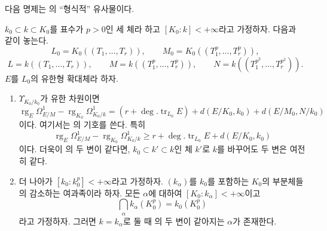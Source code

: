 다음 명제는 의 ``형식적'' 유사물이다.

\begin{proposition}[21.9.6]
\label{0.21.9.6-ko}
$k_0\subset k\subset K_0$를 표수가 $p>0$인 세 체라 하고
$[K_0:k]<+\infty$라고 가정하자. 다음과 같이 놓는다.
\[
  L_0=K_0((T_1,\ldots,T_r)),\qquad
  M_0=K_0((T_1^p,\ldots,T_r^p)),
\]
\[
  L=k((T_1,\ldots,T_r)),\qquad
  M=k((T_1^p,\ldots,T_r^p)),\qquad
  N=k((T_1^{p^2},\ldots,T_r^{p^2})).
\]
$E$를 $L_0$의 유한형 확대체라 하자.
\begin{enumerate}
  \item[\rm(i)] $\Upsilon_{K_0/k_0}$가 유한 차원이면
  \begin{equation}
  \tag{21.9.6.1}
  \label{0.21.9.6.1-ko}
    \operatorname{rg}_E\Omega^1_{E/M}
    -\operatorname{rg}_{K_0}\Omega^1_{K_0/k}
    =(r+\deg.\operatorname{tr}_{L_0}E)
      +d(E/K_0,k_0)+d(E/M_0,N/k_0)
  \end{equation}
  이다. 여기서는 의 기호를 쓴다. 특히
  \begin{equation}
  \tag{21.9.6.2}
  \label{0.21.9.6.2-ko}
    \operatorname{rg}_E\Omega^1_{E/M}
    -\operatorname{rg}_{K_0}\Omega^1_{K_0/k}
    \geqslant r+\deg.\operatorname{tr}_{L_0}E+d(E/K_0,k_0)
  \end{equation}
  이다. 더욱이 의 두 변이 같다면,
  $k_0\subset k'\subset k$인 체 $k'$로 $k$를 바꾸어도 두 변은
  여전히 같다.

  \item[\rm(ii)] 더 나아가 $[k_0:k_0^p]<+\infty$라고 가정하자.
  $(k_\alpha)$를 $k_0$를 포함하는 $K_0$의 부분체들의 감소하는
  여과족이라 하자. 모든 $\alpha$에 대하여
  $[K_0:k_\alpha]<+\infty$이고
  \[
    \bigcap_\alpha k_\alpha(K_0^p)=k_0(K_0^p)
  \]
  라고 가정하자. 그러면 $k=k_\alpha$로 둘 때
  의 두 변이 같아지는 $\alpha$가 존재한다.
\end{enumerate}
\end{proposition}

